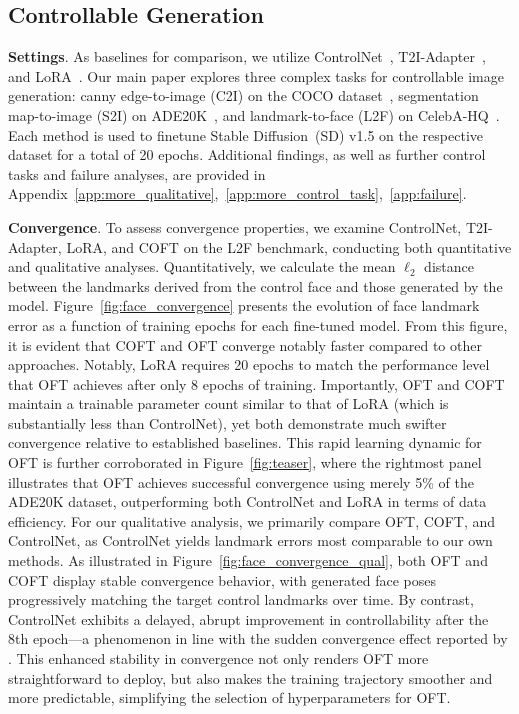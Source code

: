 \subsection{Controllable Generation}

\textbf{Settings}. As baselines for comparison, we utilize ControlNet~\cite{zhang2023adding}, T2I-Adapter~\cite{mou2023t2i}, and LoRA~\cite{hulora2022}. Our main paper explores three complex tasks for controllable image generation: canny edge-to-image (C2I) on the COCO dataset~\cite{lin2014microsoft}, segmentation map-to-image (S2I) on ADE20K~\cite{zhou2017scene}, and landmark-to-face (L2F) on CelebA-HQ~\cite{karras2018progressive,xia2021tedigan}. Each method is used to finetune Stable Diffusion~(SD) v1.5 on the respective dataset for a total of 20 epochs. Additional findings, as well as further control tasks and failure analyses, are provided in Appendix~\ref{app:more_qualitative},~\ref{app:more_control_task},~\ref{app:failure}.

\textbf{Convergence}. To assess convergence properties, we examine ControlNet, T2I-Adapter, LoRA, and COFT on the L2F benchmark, conducting both quantitative and qualitative analyses. Quantitatively, we calculate the mean $\ell_2$ distance between the landmarks derived from the control face and those generated by the model. Figure~\ref{fig:face_convergence} presents the evolution of face landmark error as a function of training epochs for each fine-tuned model. From this figure, it is evident that COFT and OFT converge notably faster compared to other approaches. Notably, LoRA requires 20 epochs to match the performance level that OFT achieves after only 8 epochs of training. Importantly, OFT and COFT maintain a trainable parameter count similar to that of LoRA (which is substantially less than ControlNet), yet both demonstrate much swifter convergence relative to established baselines. This rapid learning dynamic for OFT is further corroborated in Figure~\ref{fig:teaser}, where the rightmost panel illustrates that OFT achieves successful convergence using merely 5\% of the ADE20K dataset, outperforming both ControlNet and LoRA in terms of data efficiency. For our qualitative analysis, we primarily compare OFT, COFT, and ControlNet, as ControlNet yields landmark errors most comparable to our own methods. As illustrated in Figure~\ref{fig:face_convergence_qual}, both OFT and COFT display stable convergence behavior, with generated face poses progressively matching the target control landmarks over time. By contrast, ControlNet exhibits a delayed, abrupt improvement in controllability after the 8th epoch—a phenomenon in line with the sudden convergence effect reported by \cite{zhang2023adding}. This enhanced stability in convergence not only renders OFT more straightforward to deploy, but also makes the training trajectory smoother and more predictable, simplifying the selection of hyperparameters for OFT.

